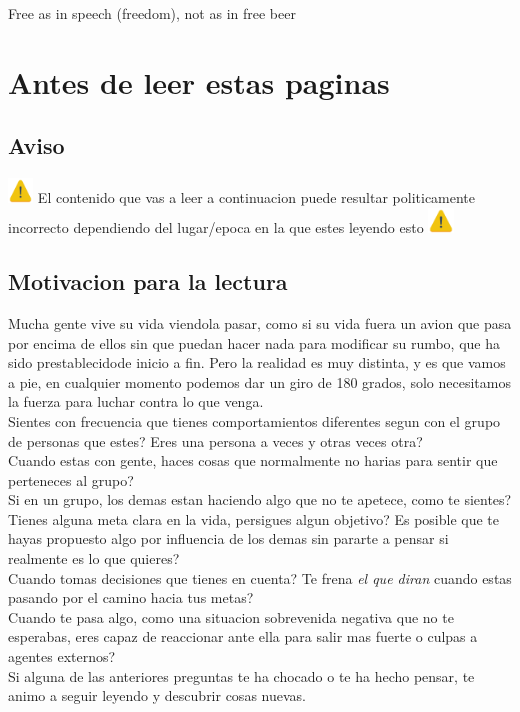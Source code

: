 \begin{savequote}
	Free as in speech (freedom), not as in free beer
\end{savequote}

\chapter{Antes de leer estas paginas}
\section{Aviso}
\begin{mdframed}[backgroundcolor=yellow]
	\includegraphics[width=0.05\textwidth]{figures/warning.png}
	El contenido que vas a leer a continuacion puede resultar politicamente incorrecto dependiendo del lugar/epoca en la que estes leyendo esto
	\includegraphics[width=0.05\textwidth]{figures/warning.png}
\end{mdframed}
\section{Motivacion para la lectura}
Mucha gente vive su vida viendola pasar, como si su vida fuera un avion que pasa por encima de ellos sin que puedan hacer nada para modificar su rumbo, que ha sido prestablecidode inicio a fin. Pero la realidad es muy distinta, y es que vamos a pie, en cualquier momento podemos dar un giro de 180 grados, solo necesitamos la fuerza para luchar contra lo que venga.\\

Sientes con frecuencia que tienes comportamientos diferentes segun con el grupo de personas que estes? Eres una persona a veces y otras veces otra? \\
Cuando estas con gente, haces cosas que normalmente no harias para sentir que perteneces al grupo? \\
Si en un grupo, los demas estan haciendo algo que no te apetece, como te sientes? \\
Tienes alguna meta clara en la vida, persigues algun objetivo? Es posible que te hayas propuesto algo por influencia de los demas sin pararte a pensar si realmente es lo que quieres? \\
Cuando tomas decisiones que tienes en cuenta? Te frena \textit{el que diran} cuando estas pasando por el camino hacia tus metas?\\
Cuando te pasa algo, como una situacion sobrevenida negativa que no te esperabas, eres capaz de reaccionar ante ella para salir mas fuerte o culpas a agentes externos?\\
Si alguna de las anteriores preguntas te ha chocado o te ha hecho pensar, te animo a seguir leyendo y descubrir cosas nuevas. \\

